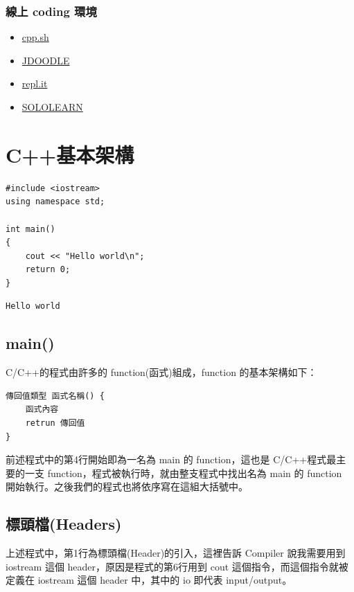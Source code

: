 \documentclass[12pt,a4paper]{article}
\begin{document}
\subsubsection{線上 coding 環境}
\label{sec:org6cbe1b0}
\begin{itemize}
\item \href{http://cpp.sh/}{cpp.sh}
\item \href{https://www.jdoodle.com/online-compiler-c++/}{JDOODLE}
\item \href{https://repl.it/languages/cpp}{repl.it}
\item \href{https://code.sololearn.com/\#cpp}{SOLOLEARN}
\end{itemize}

\section{C++基本架構}
\label{cpp_arch}
\lstset{breaklines=true,language=cpp,label= ,caption= ,captionpos=b,firstnumber=1,numbers=left}
\begin{lstlisting}
#include <iostream>
using namespace std;

int main()
{
    cout << "Hello world\n";
    return 0;
}
\end{lstlisting}

\begin{verbatim}
Hello world
\end{verbatim}
\subsection{main()}
\label{sec:org7314424}
C/C++的程式由許多的 function(函式)組成，function 的基本架構如下：
\lstset{breaklines=true,language=cpp,label= ,caption= ,captionpos=b,numbers=none}
\begin{lstlisting}
傳回值類型 函式名稱() {
    函式內容
    retrun 傳回值
}
\end{lstlisting}
前述程式中的第4行開始即為一名為 main 的 function，這也是 C/C++程式最主要的一支 function，程式被執行時，就由整支程式中找出名為 main 的 function 開始執行。之後我們的程式也將依序寫在這組大括號中。

\subsection{標頭檔(Headers)}
\label{sec:orgb3ade35}
上述程式中，第1行為標頭檔(Header)的引入，這裡告訴 Compiler 說我需要用到 iostream 這個 header，原因是程式的第6行用到 cout 這個指令，而這個指令就被定義在 iostream 這個 header 中，其中的 io 即代表 input/output。
\end{document}
